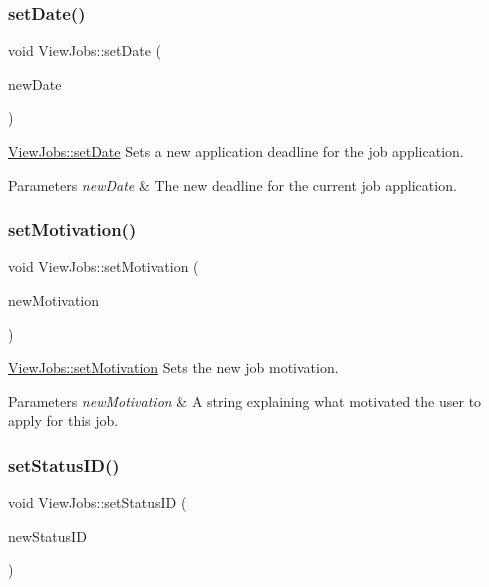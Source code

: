 \subsubsection{\texorpdfstring{set\+Date()}{setDate()}}
{\footnotesize\ttfamily void View\+Jobs\+::set\+Date (\begin{DoxyParamCaption}\item[{Q\+String}]{new\+Date }\end{DoxyParamCaption})}



\hyperlink{class_view_jobs_a7574794410eb40956f343976de97221f}{View\+Jobs\+::set\+Date} Sets a new application deadline for the job application. 


\begin{DoxyParams}{Parameters}
{\em new\+Date} & The new deadline for the current job application. \\
\hline
\end{DoxyParams}
\mbox{\label{class_view_jobs_a53bdfabaf2b442841d676f42ebbf975f}} 
\subsubsection{\texorpdfstring{set\+Motivation()}{setMotivation()}}
{\footnotesize\ttfamily void View\+Jobs\+::set\+Motivation (\begin{DoxyParamCaption}\item[{Q\+String}]{new\+Motivation }\end{DoxyParamCaption})}



\hyperlink{class_view_jobs_a53bdfabaf2b442841d676f42ebbf975f}{View\+Jobs\+::set\+Motivation} Sets the new job motivation. 


\begin{DoxyParams}{Parameters}
{\em new\+Motivation} & A string explaining what motivated the user to apply for this job. \\
\hline
\end{DoxyParams}
\mbox{\label{class_view_jobs_a55943415fd91377d5f701f7074ba58d6}} 
\subsubsection{\texorpdfstring{set\+Status\+I\+D()}{setStatusID()}}
{\footnotesize\ttfamily void View\+Jobs\+::set\+Status\+ID (\begin{DoxyParamCaption}\item[{int}]{new\+Status\+ID }\end{DoxyParamCaption})}



